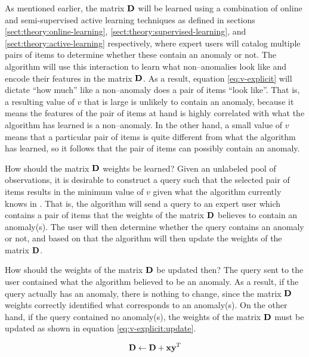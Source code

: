 As mentioned earlier, the matrix $\boldsymbol{\mathbf{D}}$ will be learned using a combination of online and semi-supervised active learning techniques as defined in sections \ref{sect:theory:online-learning}, \ref{sect:theory:supervised-learning}, and \ref{sect:theory:active-learning} respectively, where expert users will catalog multiple pairs of items to determine whether these contain an anomaly or not. The \mlblink algorithm will use this interaction to learn what non--anomalies look like and encode their features in the matrix $\boldsymbol{\mathbf{D}}$. As a result, equation \ref{eq:v-explicit} will dictate ``how much'' like a non--anomaly does a pair of items ``look like''. That is, a resulting value of $v$ that is large is unlikely to contain an anomaly, because it means the features of the pair of items at hand is highly correlated with what the \mlblink algorithm has learned is a non--anomaly. In the other hand, a small value of $v$ means that a particular pair of items is quite different from what the \mlblink algorithm has learned, so it follows that the pair of items can possibly contain an anomaly.  \newline

How should the matrix $\boldsymbol{\mathbf{D}}$ weights be learned? Given an unlabeled pool of observations, it is desirable to construct a query such that the selected pair of items results in the minimum value of $v$ given what the \mlblink algorithm currently knows in . That is, the \mlblink algorithm will send a query to an expert user which contains a pair of items that the weights of the matrix $\boldsymbol{\mathbf{D}}$ believes to contain an anomaly(s). The user will then determine whether the query contains an anomaly or not, and based on that the \mlblink algorithm will then update the weights of the matrix $\boldsymbol{\mathbf{D}}$.  \newline

How should the weights of the matrix $\boldsymbol{\mathbf{D}}$ be updated then? The query sent to the user contained what the \mlblink algorithm believed to be an anomaly. As a result, if the query actually has an anomaly, there is nothing to change, since the matrix $\boldsymbol{\mathbf{D}}$ weights correctly identified what corresponds to an anomaly(s). On the other hand, if the query contained no anomaly(s), the weights of the matrix $\boldsymbol{\mathbf{D}}$ must be updated as shown in equation \ref{eq:v-explicit:update}.

\begin{equation} \label{eq:v-explicit:update}
  \boldsymbol{\mathbf{D}} \gets \boldsymbol{\mathbf{D}} + \boldsymbol{\mathbf{x}} \boldsymbol{\mathbf{y}}^T  
\end{equation}